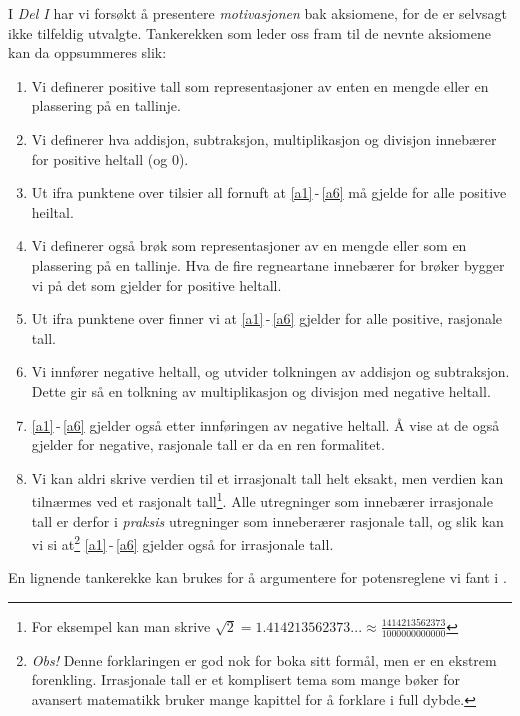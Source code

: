 \newpage
I \textsl{Del I} har vi forsøkt å presentere \textsl{motivasjonen} bak aksiomene, for de er selvsagt ikke tilfeldig utvalgte. Tankerekken som leder oss fram til de nevnte aksiomene kan da oppsummeres slik:
\begin{enumerate}
	\item Vi definerer positive tall som representasjoner av enten en mengde eller en plassering på en tallinje.
	\item Vi definerer hva addisjon, subtraksjon, multiplikasjon og divisjon innebærer for positive heltall (og 0).
	\item Ut ifra punktene over tilsier all fornuft at \eqref{a1}\,-\,\eqref{a6} må gjelde for alle positive heiltal.
	\item Vi definerer også brøk som representasjoner av en mengde eller som en plassering på en tallinje. Hva de fire regneartane innebærer for brøker bygger vi på det som gjelder for positive heltall.
	\item Ut ifra punktene over finner vi at \eqref{a1}\,-\,\eqref{a6} gjelder for alle positive, rasjonale tall.
	\item Vi innfører negative heltall, og utvider tolkningen av addisjon og subtraksjon. Dette gir så en tolkning av multiplikasjon og divisjon med negative heltall.
	\item \eqref{a1}\,-\,\eqref{a6} gjelder også etter innføringen av negative heltall. Å vise at de også gjelder for negative, rasjonale tall er da en ren formalitet.
	\item Vi kan aldri skrive verdien til et irrasjonalt tall helt eksakt, men verdien kan tilnærmes ved et rasjonalt tall\footnote{For eksempel kan man skrive $ \sqrt{2}=1.414213562373...\approx\frac{1414213562373}{1000000000000} $}. Alle utregninger som innebærer irrasjonale tall er derfor i \textsl{praksis} utregninger som inneberærer rasjonale tall, og slik kan vi si at\footnote{\textit{Obs!} Denne forklaringen er god nok for boka sitt formål, men er en ekstrem forenkling. Irrasjonale tall er et komplisert tema som mange bøker for avansert matematikk bruker mange kapittel for å forklare i full dybde.} \eqref{a1}\,-\,\eqref{a6} gjelder også for irrasjonale tall.
\end{enumerate}
En lignende tankerekke kan brukes for å argumentere for potensreglene vi fant i . 


